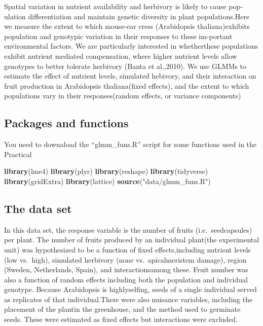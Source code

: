 \documentclass[
  12pt,
]{book}
\newenvironment{Shaded}{\begin{snugshade}}{\end{snugshade}}
\newcommand{\KeywordTok}[1]{\textcolor[rgb]{0.13,0.29,0.53}{\textbf{#1}}}
\newcommand{\NormalTok}[1]{#1}
\newcommand{\StringTok}[1]{\textcolor[rgb]{0.31,0.60,0.02}{#1}}
\begin{document}
Spatial variation in nutrient availability and herbivory is likely to cause pop-ulation differentiation and maintain genetic diversity in plant populations.Here we measure the extent to which mouse-ear cress (Arabidopsis thaliana)exhibits population and genotypic variation in their responses to these im-portant environmental factors. We are particularly interested in whetherthese populations exhibit nutrient mediated compensation, where higher nutrient levels allow genotypes to better tolerate herbivory (Banta et al.,2010). We use GLMMs to estimate the effect of nutrient levels, simulated hebivory, and their interaction on fruit production in Arabidopsis thaliana(fixed effects), and the extent to which populations vary in their responses(random effects, or variance components)

\hypertarget{packages-and-functions}{%
\subsection{Packages and functions}\label{packages-and-functions}}

You need to downaload the ``glmm\_funs.R'' script for some functions used in the Practical

\begin{Shaded}
\begin{Highlighting}[]
\KeywordTok{library}\NormalTok{(lme4)}
\KeywordTok{library}\NormalTok{(plyr)}
\KeywordTok{library}\NormalTok{(reshape)}
\KeywordTok{library}\NormalTok{(tidyverse)}
\KeywordTok{library}\NormalTok{(gridExtra)}
\KeywordTok{library}\NormalTok{(lattice)}
\KeywordTok{source}\NormalTok{(}\StringTok{"data/glmm_funs.R"}\NormalTok{)}
\end{Highlighting}
\end{Shaded}

\hypertarget{the-data-set}{%
\subsection{The data set}\label{the-data-set}}

In this data set, the response variable is the number of fruits (i.e.~seedcapsules) per plant. The number of fruits produced by an individual plant(the experimental unit) was hypothesized to be a function of fixed effects,including nutrient levels (low vs.~high), simulated herbivory (none vs.~apicalmeristem damage), region (Sweden, Netherlands, Spain), and interactionsamong these. Fruit number was also a function of random effects including both the population and individual genotype. Because Arabidopsis is highlyselfing, seeds of a single individual served as replicates of that individual.There were also nuisance variables, including the placement of the plantin the greenhouse, and the method used to germinate seeds. These were estimated as fixed effects but interactions were excluded.
\end{document}
